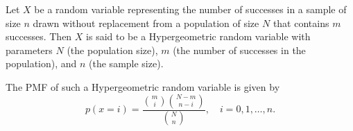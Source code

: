 \documentclass{article}
\begin{document}
Let \( X \) be a random variable representing the number of successes in a sample of size \( n \) drawn without replacement from a population of size \( N \) that contains \( m \) successes. Then \( X \) is said to be a Hypergeometric random variable with parameters \( N \) (the population size), \( m \) (the number of successes in the population), and \( n \) (the sample size).

The PMF of such a Hypergeometric random variable is given by
\[
p(x = i) = \frac{\binom{m}{i} \binom{N - m}{n - i}}{\binom{N}{n}}, \quad i = 0, 1, \ldots, n.
\]
\end{document}

